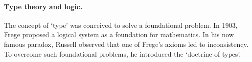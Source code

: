 \documentclass[11pt,twocolumn]{article}
\newcommand{\lcalculus}{\mbox{$\lambda$-calculus}}
\begin{document}

\paragraph{Type theory and logic.}
\label{SectionATypeTheoryAndLogicParagraph}

The concept of `type' was conceived to solve a foundational
problem.  In 1903, %
Frege proposed
a logical system as a foundation for mathematics.
In his now famous paradox, 
Russell %
observed that one of Frege's axioms led to inconsistency.  
To overcome such foundational problems, 
he %
introduced the `doctrine of types'. 
\end{document}
